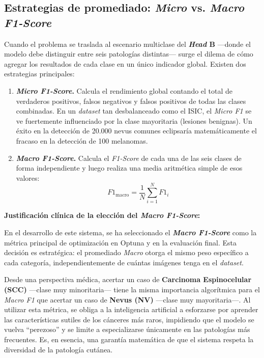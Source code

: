 \subsection{Estrategias de promediado: \textit{Micro} vs. \textit{Macro F1-Score}}

Cuando el problema se traslada al escenario multiclase del \textbf{\textit{Head} B} ---donde el modelo debe distinguir entre seis patologías distintas--- surge el dilema de cómo agregar los resultados de cada clase en un único indicador global. Existen dos estrategias principales:

\begin{enumerate}
	\item \textbf{\textit{Micro F1-Score}.} Calcula el rendimiento global contando el total de verdaderos positivos, falsos negativos y falsos positivos de todas las clases combinadas. En un \textit{dataset} tan desbalanceado como el ISIC, el \textit{Micro F1} se ve fuertemente influenciado por la clase mayoritaria (lesiones benignas). Un éxito en la detección de 20.000 nevus comunes eclipsaría matemáticamente el fracaso en la detección de 100 melanomas.
	
	\item \textbf{\textit{Macro F1-Score}.} Calcula el \textit{F1-Score} de cada una de las seis clases de forma independiente y luego realiza una media aritmética simple de esos valores:
	\begin{equation}
		F1_{\text{macro}} = \frac{1}{N} \sum_{i=1}^{N} F1_i
	\end{equation}
\end{enumerate}



\textbf{Justificación clínica de la elección del \textit{Macro F1-Score}:}

En el desarrollo de este sistema, se ha seleccionado el \textbf{\textit{Macro F1-Score}} como la métrica principal de optimización en Optuna y en la evaluación final. Esta decisión es estratégica: el promediado \textit{Macro} otorga el mismo peso específico a cada categoría, independientemente de cuántas imágenes tenga en el \textit{dataset}.

Desde una perspectiva médica, acertar un caso de \textbf{Carcinoma Espinocelular (SCC)} ---clase muy minoritaria--- tiene la misma importancia algorítmica para el \textit{Macro F1} que acertar un caso de \textbf{Nevus (NV)} ---clase muy mayoritaria---. Al utilizar esta métrica, se obliga a la inteligencia artificial a esforzarse por aprender las características sutiles de los cánceres más raros, impidiendo que el modelo se vuelva ``perezoso'' y se limite a especializarse únicamente en las patologías más frecuentes. Es, en esencia, una garantía matemática de que el sistema respeta la diversidad de la patología cutánea.

